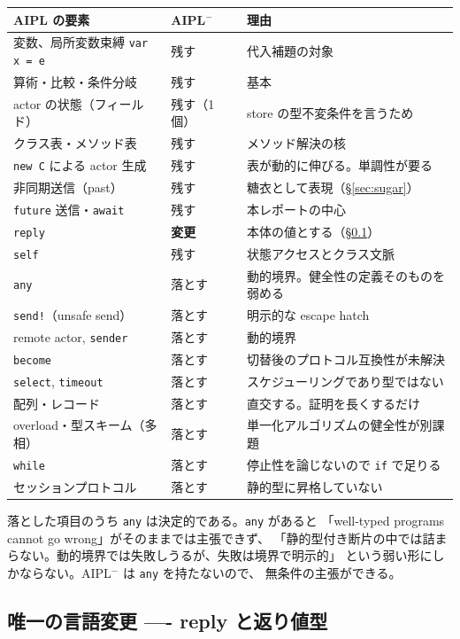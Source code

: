 \documentclass[11pt,a4paper]{ltjsarticle}
\theoremstyle{definition}
\theoremstyle{remark}
\begin{document}
\begin{center}
\begin{tabular}{@{}lll@{}}
\toprule
AIPL の要素 & AIPL$^-$ & 理由 \\
\midrule
変数、局所変数束縛 \verb|var x = e| & 残す & 代入補題の対象 \\
算術・比較・条件分岐 & 残す & 基本 \\
actor の状態（フィールド） & 残す（1 個） & store の型不変条件を言うため \\
クラス表・メソッド表 & 残す & メソッド解決の核 \\
\verb|new C| による actor 生成 & 残す & 表が動的に伸びる。単調性が要る \\
非同期送信（past）& 残す & 糖衣として表現（\S\ref{sec:sugar}）\\
\verb|future| 送信・\verb|await| & 残す & 本レポートの中心 \\
\verb|reply| & \textbf{変更} & 本体の値とする（\S\ref{sec:change}）\\
\verb|self| & 残す & 状態アクセスとクラス文脈 \\
\midrule
\verb|any| & 落とす & 動的境界。健全性の定義そのものを弱める \\
\verb|send!|（unsafe send）& 落とす & 明示的な escape hatch \\
remote actor, \verb|sender| & 落とす & 動的境界 \\
\verb|become| & 落とす & 切替後のプロトコル互換性が未解決 \\
\verb|select|, \verb|timeout| & 落とす & スケジューリングであり型ではない \\
配列・レコード & 落とす & 直交する。証明を長くするだけ \\
overload・型スキーム（多相）& 落とす & 単一化アルゴリズムの健全性が別課題 \\
\verb|while| & 落とす & 停止性を論じないので \verb|if| で足りる \\
セッションプロトコル & 落とす & 静的型に昇格していない \\
\bottomrule
\end{tabular}
\end{center}

落とした項目のうち \verb|any| は決定的である。\verb|any| があると
「well-typed programs cannot go wrong」がそのままでは主張できず、
「静的型付き断片の中では詰まらない。動的境界では失敗しうるが、失敗は境界で明示的」
という弱い形にしかならない。AIPL$^-$ は \verb|any| を持たないので、
無条件の主張ができる。

\subsection{唯一の言語変更 ---- reply と返り値型}
\label{sec:change}
\end{document}
